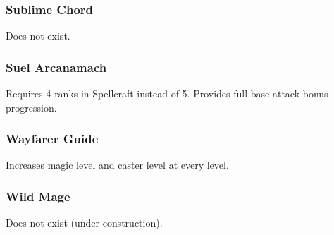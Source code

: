 \subsubsection{Sublime Chord}
Does not exist.
\subsubsection{Suel Arcanamach}
 Requires 4 ranks in Spellcraft instead of 5.
 Provides full base attack bonus progression.
\subsubsection{Wayfarer Guide}
 Increases magic level and caster level at every level.
\subsubsection{Wild Mage}
Does not exist (under construction).
